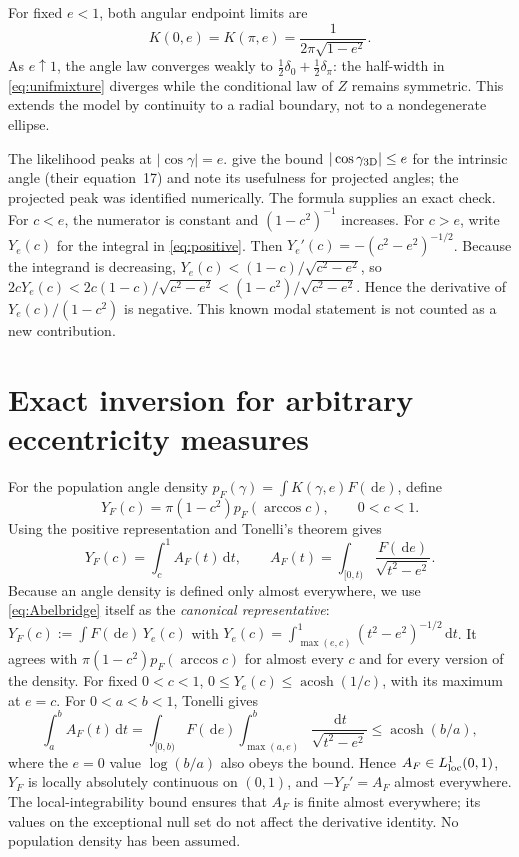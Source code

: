 \documentclass[11pt,a4paper]{article}
\theoremstyle{remark}\newtheorem{remark}[theorem]{Remark}
\DeclareMathOperator{\acosh}{acosh}
\newcommand{\dd}{\,\mathrm d}
\begin{document}
For fixed $e<1$, both angular endpoint limits are
\begin{equation}\label{eq:endpoint}
K(0,e)=K(\pi,e)=\frac{1}{2\pi\sqrt{1-e^2}}.
\end{equation}
As $e\uparrow1$, the angle law converges weakly to $\tfrac12\delta_0+\tfrac12\delta_\pi$: the half-width in \eqref{eq:unifmixture} diverges while the conditional law of $Z$ remains symmetric. This extends the model by continuity to a radial boundary, not to a nondegenerate ellipse.

The likelihood peaks at $|\cos\gamma|=e$. \citet{Hwang2022} give the bound $|\cos\gamma_{\rm 3D}|\le e$ for the intrinsic angle (their equation~17) and note its usefulness for projected angles; the projected peak was identified numerically. The formula supplies an exact check. For $c<e$, the numerator is constant and $(1-c^2)^{-1}$ increases. For $c>e$, write $Y_e(c)$ for the integral in \eqref{eq:positive}. Then $Y_e'(c)=-(c^2-e^2)^{-1/2}$. Because the integrand is decreasing, $Y_e(c)<(1-c)/\sqrt{c^2-e^2}$, so
$2cY_e(c)<2c(1-c)/\sqrt{c^2-e^2}<(1-c^2)/\sqrt{c^2-e^2}$. Hence the derivative of $Y_e(c)/(1-c^2)$ is negative. This known modal statement is not counted as a new contribution.

\section{Exact inversion for arbitrary eccentricity measures}\label{sec:inverse}

For the population angle density $p_F(\gamma)=\int K(\gamma,e)F(\dd e)$, define
\begin{equation}\label{eq:Y}
Y_F(c)=\pi(1-c^2)p_F(\arccos c),\qquad 0<c<1.
\end{equation}
Using the positive representation and Tonelli's theorem gives
\begin{equation}\label{eq:Abelbridge}
Y_F(c)=\int_c^1 A_F(t)\dd t,
\qquad A_F(t)=\int_{[0,t)}\frac{F(\dd e)}{\sqrt{t^2-e^2}}.
\end{equation}
Because an angle density is defined only almost everywhere, we use \eqref{eq:Abelbridge} itself as the \emph{canonical representative}: $Y_F(c):=\int F(\dd e)\,Y_e(c)$ with $Y_e(c)=\int_{\max(e,c)}^1(t^2-e^2)^{-1/2}\dd t$. It agrees with $\pi(1-c^2)p_F(\arccos c)$ for almost every $c$ and for every version of the density. For fixed $0<c<1$, $0\le Y_e(c)\le\acosh(1/c)$, with its maximum at $e=c$. For $0<a<b<1$, Tonelli gives
\begin{equation}
\int_a^bA_F(t)\dd t=\int_{[0,b)}F(\dd e)\int_{\max(a,e)}^{b}\frac{\dd t}{\sqrt{t^2-e^2}}\le\acosh(b/a),
\end{equation}
where the $e=0$ value $\log(b/a)$ also obeys the bound. Hence $A_F\in L^1_{\rm loc}(0,1)$, $Y_F$ is locally absolutely continuous on $(0,1)$, and $-Y_F'=A_F$ almost everywhere. The local-integrability bound ensures that $A_F$ is finite almost everywhere; its values on the exceptional null set do not affect the derivative identity. No population density has been assumed.
\end{document}

